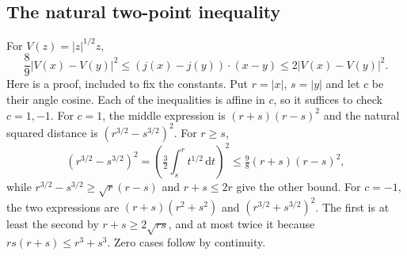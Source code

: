 \documentclass[11pt,a4paper]{article}
\theoremstyle{definition}\newtheorem{definition}[theorem]{Definition}
\theoremstyle{remark}\newtheorem{remark}[theorem]{Remark}
\newcommand{\dd}{\,\mathrm d}
\numberwithin{equation}{section}
\begin{document}
\subsection{The natural two-point inequality}
For $V(z)=|z|^{1/2}z$,
\begin{equation}\label{eq:naturaldistance}
 \frac89|V(x)-V(y)|^2
 \le(j(x)-j(y))\cdot(x-y)
 \le2|V(x)-V(y)|^2.
\end{equation}
Here is a proof, included to fix the constants. Put $r=|x|$, $s=|y|$ and let $c$ be their angle cosine. Each of the inequalities is affine in $c$, so it suffices to check $c=1,-1$. For $c=1$, the middle expression is $(r+s)(r-s)^2$ and the natural squared distance is $(r^{3/2}-s^{3/2})^2$. For $r\ge s$,
\[
 (r^{3/2}-s^{3/2})^2
 =\left(\tfrac32\int_s^r t^{1/2}\dd t\right)^2
 \le\tfrac98(r+s)(r-s)^2,
\]
while $r^{3/2}-s^{3/2}\ge\sqrt r(r-s)$ and $r+s\le2r$ give the other bound. For $c=-1$, the two expressions are $(r+s)(r^2+s^2)$ and $(r^{3/2}+s^{3/2})^2$. The first is at least the second by $r+s\ge2\sqrt{rs}$, and at most twice it because $rs(r+s)\le r^3+s^3$. Zero cases follow by continuity.
\end{document}
